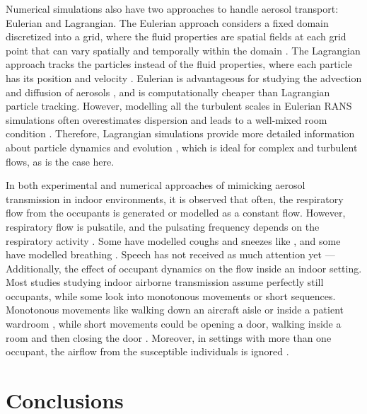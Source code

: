 \documentclass[a4paper,12pt]{elsarticle}
\begin{document}
Numerical simulations also have two approaches to handle aerosol transport: Eulerian and Lagrangian. The Eulerian approach considers a fixed domain discretized into a grid, where the fluid properties are spatial fields at each grid point that can vary spatially and temporally within the domain \cite{ferziger2002computational}. The Lagrangian approach tracks the particles instead of the fluid properties, where each particle has its position and velocity \cite{gualtieri2017lagrangian}. Eulerian is advantageous for studying the advection and diffusion of aerosols \cite{pan2022boundary,pan2023predicting}, and is computationally cheaper than Lagrangian particle tracking. However, modelling all the turbulent scales in Eulerian RANS simulations often overestimates dispersion and leads to a well-mixed room condition \cite{ou2022insufficient}. Therefore, Lagrangian simulations provide more detailed information about particle dynamics and evolution \cite{xu2023cfd}, which is ideal for complex and turbulent flows, as is the case here.

In both experimental and numerical approaches of mimicking aerosol transmission in indoor environments, it is observed that often, the respiratory flow from the occupants is generated \cite{zhou2021experimental,romano2015numerical} or modelled  \cite{ren2021numerical,li2023numerical,wu2023numerical} as a constant flow. However, respiratory flow is pulsatile, and the pulsating frequency depends on the respiratory activity \cite{semple1983measurement,kelly2004modeling}. Some have modelled coughs and sneezes like \cite{mirzaie2021covid}, and some have modelled breathing \cite{he2011cfd,shao2021risk}. Speech has not received as much attention yet \cite{giri2022colliding,singhal2022virus}—Additionally, the effect of occupant dynamics on the flow inside an indoor setting. Most studies studying indoor airborne transmission assume perfectly still occupants, while some look into monotonous movements or short sequences. Monotonous movements like walking down an aircraft aisle or inside a patient wardroom \cite{poussou2010flow,wu2023numerical}, while short movements could be opening a door, walking inside a room and then closing the door \cite{saarinen2015large}. Moreover, in settings with more than one occupant, the airflow from the susceptible individuals is ignored \cite{jain2023numerical}.

\section{Conclusions}
\end{document}
